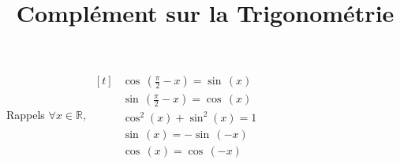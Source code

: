 \documentclass{cours}
\title{Complément sur la Trigonométrie}
\let\frac\tfrac %
\begin{document}

    \begin{Gpartie}{Rappels}
        $\forall x\in\mathbb{R},~
        \begin{aligned}[t]&\cos\,\left(\frac{\pi}{2}-x\right)=\sin\,(x) \\
            &\sin\,\left(\frac{\pi}{2}-x\right)=\cos\,(x) \\
            &\cos^2(x)+\sin^2(x)=1 \\
            &\sin\,(x)=-\sin\,(-x) \\
            &\cos\,(x)=\cos\,(-x)
        \end{aligned}$
    \end{Gpartie}
\end{document}
